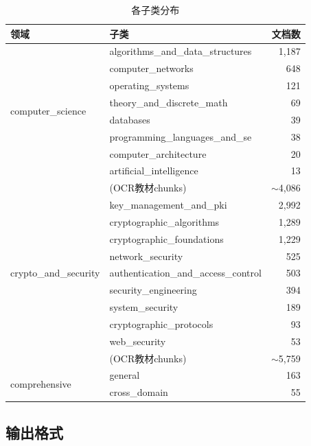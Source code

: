 \documentclass[12pt,a4paper]{ctexart}
\begin{document}
\begin{table}[htbp]
\centering
\caption{各子类分布}
\label{tab:subcats}
\small
\begin{tabular}{@{}llr@{}}
\toprule
\textbf{领域} & \textbf{子类} & \textbf{文档数} \\
\midrule
\multirow{8}{*}{computer\_science}
    & algorithms\_and\_data\_structures  & 1,187 \\
    & computer\_networks                  & 648 \\
    & operating\_systems                  & 121 \\
    & theory\_and\_discrete\_math          & 69 \\
    & databases                           & 39 \\
    & programming\_languages\_and\_se       & 38 \\
    & computer\_architecture              & 20 \\
    & artificial\_intelligence            & 13 \\
    & (OCR教材chunks)                     & $\sim$4,086 \\
\midrule
\multirow{9}{*}{crypto\_and\_security}
    & key\_management\_and\_pki            & 2,992 \\
    & cryptographic\_algorithms           & 1,289 \\
    & cryptographic\_foundations          & 1,229 \\
    & network\_security                   & 525 \\
    & authentication\_and\_access\_control & 503 \\
    & security\_engineering               & 394 \\
    & system\_security                    & 189 \\
    & cryptographic\_protocols            & 93 \\
    & web\_security                       & 53 \\
    & (OCR教材chunks)                     & $\sim$5,759 \\
\midrule
\multirow{2}{*}{comprehensive}
    & general                             & 163 \\
    & cross\_domain                        & 55 \\
\bottomrule
\end{tabular}
\end{table}

\subsection{输出格式}
\end{document}
